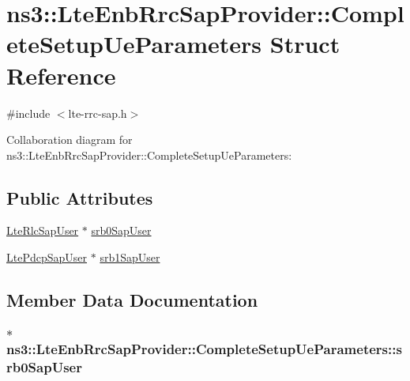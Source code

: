 \hypertarget{structns3_1_1LteEnbRrcSapProvider_1_1CompleteSetupUeParameters}{}\section{ns3\+:\+:Lte\+Enb\+Rrc\+Sap\+Provider\+:\+:Complete\+Setup\+Ue\+Parameters Struct Reference}
\label{structns3_1_1LteEnbRrcSapProvider_1_1CompleteSetupUeParameters}


{\ttfamily \#include $<$lte-\/rrc-\/sap.\+h$>$}



Collaboration diagram for ns3\+:\+:Lte\+Enb\+Rrc\+Sap\+Provider\+:\+:Complete\+Setup\+Ue\+Parameters\+:
\subsection*{Public Attributes}
\begin{DoxyCompactItemize}
\item 
\hyperlink{classns3_1_1LteRlcSapUser}{Lte\+Rlc\+Sap\+User} $\ast$ \hyperlink{structns3_1_1LteEnbRrcSapProvider_1_1CompleteSetupUeParameters_ac4608e5d5d57d5702f811c95758edde9}{srb0\+Sap\+User}
\item 
\hyperlink{classns3_1_1LtePdcpSapUser}{Lte\+Pdcp\+Sap\+User} $\ast$ \hyperlink{structns3_1_1LteEnbRrcSapProvider_1_1CompleteSetupUeParameters_a7025f17034b8298ee744a16ab4bdd4a7}{srb1\+Sap\+User}
\end{DoxyCompactItemize}


\subsection{Member Data Documentation}
\subsubsection[{\texorpdfstring{srb0\+Sap\+User}{srb0SapUser}}]{$\ast$ ns3\+::\+Lte\+Enb\+Rrc\+Sap\+Provider\+::\+Complete\+Setup\+Ue\+Parameters\+::srb0\+Sap\+User}\hypertarget{structns3_1_1LteEnbRrcSapProvider_1_1CompleteSetupUeParameters_ac4608e5d5d57d5702f811c95758edde9}{}\label{structns3_1_1LteEnbRrcSapProvider_1_1CompleteSetupUeParameters_ac4608e5d5d57d5702f811c95758edde9}
